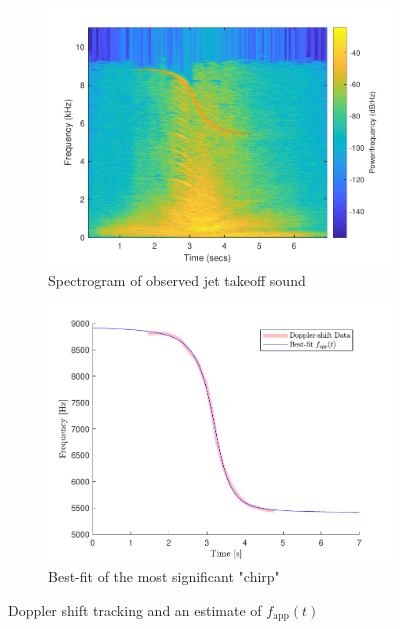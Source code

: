 \documentclass[10pt]{article}
\begin{document}
\begin{figure}[ht]
    \centering
    \begin{subfigure}[b]{0.48\textwidth}
        \includegraphics[width=\textwidth]{problem10_jet_spectrogram_doppler_shift_tracking.pdf}
        \caption{Spectrogram of observed jet takeoff sound}
    \end{subfigure}
    \quad
    \begin{subfigure}[b]{0.48\textwidth}
        \includegraphics[width=\textwidth]{problem10_f_app_best_fit_estimate.pdf}
        \caption{Best-fit of the most significant "chirp"}
    \end{subfigure}
    \caption{Doppler shift tracking and an estimate of $f_\text{app}(t)$\vspace{-0.5cm}}
    \label{doppler_shift_chirp}
\end{figure}
\end{document}
